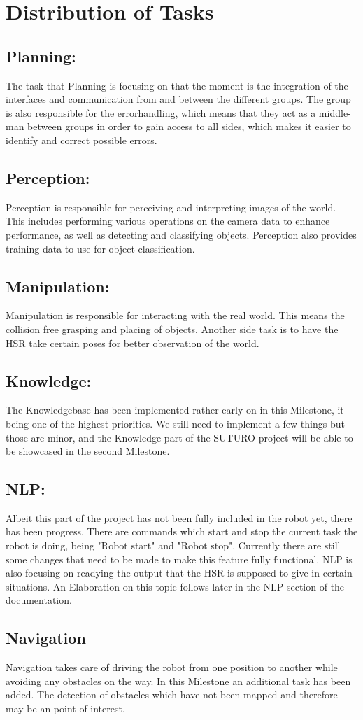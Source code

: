 \documentclass[main.tex]{subfiles}
\begin{document}
	
	\chapter{Distribution of Tasks}

		\section{Planning:}
		The task that Planning is focusing on that the moment is the integration of the interfaces and communication from and between the different groups. The group is also responsible for the errorhandling, which means that they act as a middle-man between groups in order to gain access to all sides, which makes it easier to identify and correct possible errors.
		
		\section{Perception:}
		Perception is responsible for perceiving and interpreting images of the world. This includes performing various operations on the camera data to enhance performance, as well as detecting and classifying objects. Perception also provides training data to use for object classification.
		
		
		\section{Manipulation:}
		Manipulation is responsible for interacting with the real world. This means the collision free grasping and placing of objects. Another side task is to have the HSR take certain poses for better observation of the world. 
		
		\section{Knowledge:}
		The Knowledgebase has been implemented rather early on in this Milestone, it being one of the highest priorities. We still need to implement a few things but those are minor, and the Knowledge part of the SUTURO project will be able to be showcased in the second Milestone. 
		
		\section{NLP:}
		Albeit this part of the project has not been fully included in the robot yet, there has been progress. There are commands which start and stop the current task the robot is doing, being "Robot start" and "Robot stop". Currently there are still some changes that need to be made to make this feature fully functional. NLP is also focusing on readying the output that the HSR is supposed to give in certain situations. An Elaboration on this topic follows later in the NLP section of the documentation.  
		
		\section{Navigation}
		Navigation takes care of driving the robot from one position to another while avoiding any obstacles on the way. In this Milestone an additional task has been added. The detection of obstacles which have not been mapped and therefore may be an point of interest.
\end{document}
